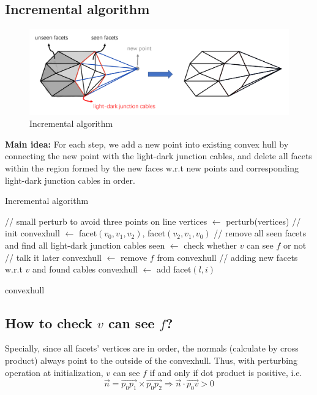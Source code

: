 \documentclass[acmtog]{acmart}
\begin{document}
\subsection{Incremental algorithm}
\begin{figure}[h]
	\centering
	\includegraphics[scale=0.1]{incremental algorithm.png}
	\caption{Incremental algorithm}
	\label{fig:img2}
\end{figure}
	\quad \textbf{Main idea:} For each step, we add a new point into existing convex hull by connecting the new point with the light-dark junction cables, and delete all facets within the region formed by the new faces w.r.t new points and corresponding light-dark junction cables in order.

\begin{algorithm}
	\caption{Incremental algorithm}
	\begin{algorithmic}[1]
		\STATE // small perturb to avoid three points on line
		\STATE vertices $\leftarrow$ perturb(vertices) 
		\STATE // init
		\STATE  convexhull $\leftarrow$ facet$(v_0, v_1, v_2)$, facet$(v_2, v_1, v_0)$
			\STATE // remove all seen facets and find all light-dark junction cables
				\STATE seen $\leftarrow$ check whether $v$ can see $f$ or not // talk it later
					\STATE convexhull $\leftarrow$ remove $f$ from convexhull
				\ENDIF
			\ENDFOR
			\STATE // adding new facets w.r.t $v$ and found cables
				\STATE convexhull $\leftarrow$ add facet$(l, i)$
			\ENDFOR
			
		\ENDFOR
		\RETURN  convexhull
	\end{algorithmic}
\end{algorithm}
	
\subsection*{How to check $v$ can see $f$?}
	\quad Specially, since all facets' vertices are in order, the normals (calculate by cross product) always point to the outside of the convexhull. Thus, with perturbing operation at initialization, $v$ can see $f$ if and only if dot product is positive, i.e. 
	\[
	\vec{n} = \vec{p_0p_1} \times \vec{p_0p_2} \Longrightarrow \vec{n} \cdot \vec{p_0v} > 0
	\]
\end{document}
